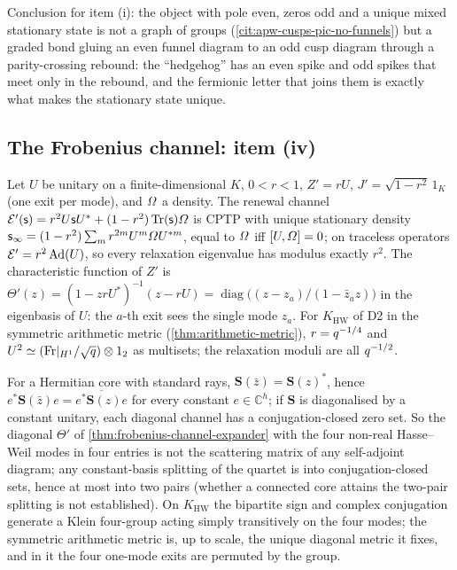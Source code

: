 Conclusion for item (i): the object with pole even, zeros odd and a unique mixed stationary state is not a
graph of groups (\cref{cit:apw-cusps-pic-no-funnels}) but a graded bond gluing an even funnel diagram to an odd
cusp diagram through a parity-crossing rebound: the ``hedgehog'' has an even spike and odd spikes that meet
only in the rebound, and the fermionic letter that joins them is exactly what makes the stationary state unique.

\subsection{The Frobenius channel: item (iv)}

\begin{theorem}
\label{thm:frobenius-channel-expander}
Let $U$ be unitary on a finite-dimensional $K$, $0<r<1$, $Z' = rU$, $J' = \sqrt{1-r^2}\,1_K$ (one exit per mode),
and $\varOmega$ a density. The renewal channel $\mathcal E'(\mathsf s) = r^2U\mathsf s U^{*}+(1-r^2)\operatorname{Tr}(\mathsf s)\varOmega$ is CPTP with
unique stationary density $\mathsf s_\infty = (1-r^2)\sum_mr^{2m}U^m\varOmega U^{*m}$, equal to $\varOmega$ iff $[U,\varOmega] = 0$; on
traceless operators $\mathcal E' = r^2\operatorname{Ad}(U)$, so every relaxation eigenvalue has modulus exactly $r^2$. The
characteristic function of $Z'$ is $\Theta'(z) = (1-zrU^{*})^{-1}(z-rU) = \operatorname{diag}\big((z-z_a)/(1-\bar z_az)\big)$
in the eigenbasis of $U$: the $a$-th exit sees the single mode $z_a$. For $K_{\mathrm{HW}}$ of D2 in the symmetric
arithmetic metric (\cref{thm:arithmetic-metric}), $r = q^{-1/4}$ and $U^2\simeq(\mathrm{Fr}|_{H^1}/\sqrt{q})\otimes1_2$
as multisets; the relaxation moduli are all $q^{-1/2}$.
\end{theorem}

\begin{proposition}
\label{prop:no-selfadjoint-one-mode-exits}
For a Hermitian core with standard rays, $\mathbf S(\bar z) = \mathbf S(z)^{*}$, hence $e^{*}\mathbf S(\bar z)e =
\overline{e^{*}\mathbf S(z)e}$ for every constant $e\in\mathbb C^h$; if $\mathbf S$ is diagonalised by a constant
unitary, each diagonal channel has a conjugation-closed zero set. So the diagonal $\Theta'$ of
\cref{thm:frobenius-channel-expander} with the four non-real Hasse--Weil modes in four entries is not the
scattering matrix of any self-adjoint diagram; any constant-basis splitting of the quartet is into conjugation-closed
sets, hence at most into two pairs (whether a connected core attains the two-pair splitting is not established). On
$K_{\mathrm{HW}}$ the bipartite sign and complex conjugation generate a Klein four-group acting simply transitively on
the four modes; the symmetric arithmetic metric is, up to scale, the unique diagonal metric it fixes, and in it the four one-mode exits are permuted by the group.
\end{proposition}

